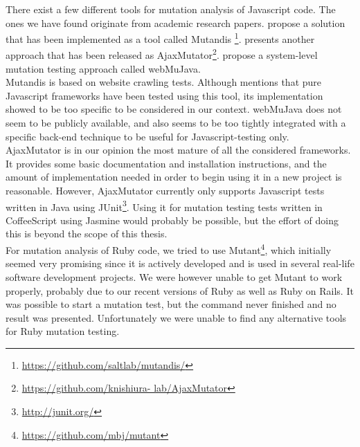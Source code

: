 \label{sec:choices_mutation}

There exist a few different tools for mutation analysis of Javascript
code. The ones we have found originate from academic research papers.
\citet{paper:mutandis} propose a solution that has been implemented as
a tool called Mutandis
\footnote{\url{https://github.com/saltlab/mutandis/}}.
\citet{paper:ajaxmutator} presents another approach that has been
released as AjaxMutator\footnote{\url{https://github.com/knishiura-
lab/AjaxMutator}}. \citet{paper:webmujava} propose a system-level
mutation testing approach called webMuJava.\\

Mutandis is based on website crawling tests. Although
\citeauthor{paper:mutandis} mentions that pure Javascript frameworks
have been tested using this tool, its implementation showed to be too
specific to be considered in our context. webMuJava does not seem to be
publicly available, and also seems to be too tightly integrated with a
specific back-end technique to be useful for Javascript-testing only.\\

AjaxMutator is in our opinion the most mature of all the considered
frameworks. It provides some basic documentation and installation
instructions, and the amount of implementation needed in order to begin
using it in a new project is reasonable. However, AjaxMutator currently
only supports Javascript tests written in Java using
JUnit\footnote{\url{http://junit.org/}}. Using it for mutation testing
tests written in CoffeeScript using Jasmine would probably be possible,
but the effort of doing this is beyond the scope of this thesis.\\

For mutation analysis of Ruby code, we tried to use
Mutant\footnote{\url{https://github.com/mbj/mutant}}, which initially
seemed very promising since it is actively developed and is used in
several real-life software development projects. We were however unable
to get Mutant to work properly, probably due to our recent versions of
Ruby as well as Ruby on Rails. It was possible to start a mutation test,
but the command never finished and no result was presented.
Unfortunately we were unable to find any alternative tools for Ruby
mutation testing.\\
